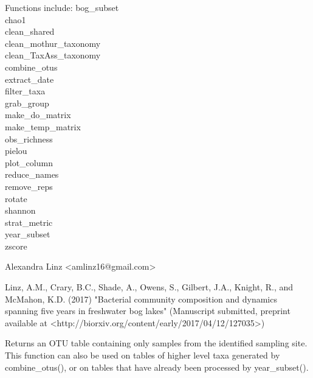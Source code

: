 \documentclass[a4paper]{book}
\begin{document}
%
\begin{Details}\relax

Functions include:
bog\_subset \\{}
chao1 \\{}
clean\_shared \\{}
clean\_mothur\_taxonomy \\{}
clean\_TaxAss\_taxonomy \\{}
combine\_otus \\{}
extract\_date \\{}
filter\_taxa \\{}
grab\_group \\{}
make\_do\_matrix \\{}
make\_temp\_matrix \\{}
obs\_richness \\{}
pielou \\{}
plot\_column \\{}
reduce\_names \\{}
remove\_reps \\{}
rotate \\{}
shannon \\{}
strat\_metric \\{}
year\_subset \\{}
zscore \\{}
\end{Details}
%
\begin{Author}\relax
Alexandra Linz <amlinz16@gmail.com>
\end{Author}
%
\begin{References}\relax
Linz, A.M., Crary, B.C., Shade, A., Owens, S., Gilbert, J.A., Knight, R., and McMahon, K.D. (2017) "Bacterial community composition and dynamics spanning five years in freshwater bog lakes" (Manuscript submitted, preprint available at <http://biorxiv.org/content/early/2017/04/12/127035>)
\end{References}
%
\begin{Description}\relax
Returns an OTU table containing only samples from the identified sampling site. This function can also be used on tables of higher level taxa generated by combine\_otus(), or on tables that have already been processed by year\_subset().
\end{Description}
\end{document}
